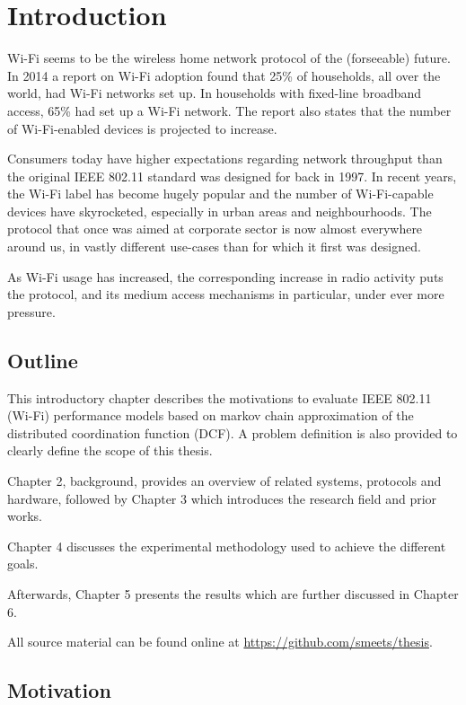 
\chapter{Introduction}

Wi-Fi seems to be the wireless home network protocol of the (forseeable)
future. In 2014 a report on Wi-Fi adoption found that 25\% of households, all
over the world, had Wi-Fi networks set up. In households with fixed-line
broadband access, 65\% had set up a Wi-Fi network\cite{smith}. The report also
states that the number of Wi-Fi-enabled devices is projected to increase.

Consumers today have higher expectations regarding network throughput than the
original IEEE 802.11 standard was designed for back in 1997. In recent years,
the Wi-Fi label has become hugely popular and the number of Wi-Fi-capable
devices have skyrocketed, especially in urban areas and neighbourhoods. The
protocol that once was aimed at corporate sector is now almost everywhere
around us, in vastly different use-cases than for which it first was designed.

As Wi-Fi usage has increased, the corresponding increase in radio activity
puts the protocol, and its medium access mechanisms in particular, under ever
more pressure. 

\section{Outline} 

This introductory chapter describes the motivations to evaluate IEEE 802.11
(Wi-Fi) performance models based on markov chain approximation of the
distributed coordination function (DCF). A problem definition is also provided
to clearly define the scope of this thesis.

Chapter 2, background, provides an overview of related systems, protocols and
hardware, followed by Chapter 3 which introduces the research field and prior
works.

Chapter 4 discusses the experimental methodology used to achieve the different
goals.	

Afterwards, Chapter 5 presents the results which are further discussed in
Chapter 6.

All source material can be found online at \url{https://github.com/smeets/thesis}.

\section{Motivation} 

